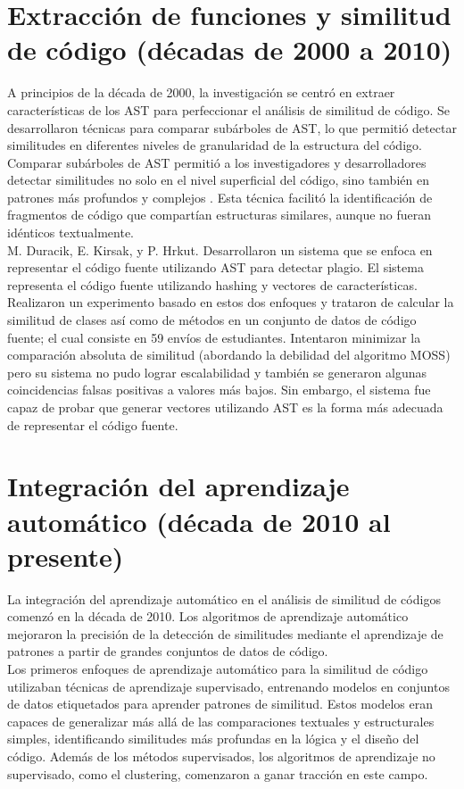 \section*{\textbf{Extracción de funciones y similitud de código (décadas de 2000 a 2010)}}
A principios de la década de 2000, la investigación se centró en extraer características de los AST para perfeccionar el análisis de similitud de código. Se desarrollaron técnicas para comparar subárboles de AST, lo que permitió detectar similitudes en diferentes niveles de granularidad de la estructura del código. \\

Comparar subárboles de AST permitió a los investigadores y desarrolladores detectar similitudes no solo en el nivel superficial del código, sino también en patrones más profundos y complejos \cite{kam2005analyzing}. Esta técnica facilitó la identificación de fragmentos de código que compartían estructuras similares, aunque no fueran idénticos textualmente. \\

M. Duracik, E. Kirsak, y P. Hrkut. \cite{duracik2018source} Desarrollaron un sistema que se enfoca en representar el código fuente utilizando AST para detectar plagio. El sistema representa el código fuente utilizando hashing y vectores de características. Realizaron un experimento basado en estos dos enfoques y trataron de calcular la similitud de clases así como de métodos en un conjunto de datos de código fuente; el cual consiste en 59 envíos de estudiantes. Intentaron minimizar la comparación absoluta de similitud (abordando la debilidad del algoritmo MOSS) pero su sistema no pudo lograr escalabilidad y también se generaron algunas coincidencias falsas positivas a valores más bajos. Sin embargo, el sistema fue capaz de probar que generar vectores utilizando AST es la forma más adecuada de representar el código fuente.

\section*{\textbf{Integración del aprendizaje automático (década de 2010 al presente)}}
La integración del aprendizaje automático en el análisis de similitud de códigos comenzó en la década de 2010. Los algoritmos de aprendizaje automático mejoraron la precisión de la detección de similitudes mediante el aprendizaje de patrones a partir de grandes conjuntos de datos de código. \\

Los primeros enfoques de aprendizaje automático para la similitud de código utilizaban técnicas de aprendizaje supervisado, entrenando modelos en conjuntos de datos etiquetados para aprender patrones de similitud. Estos modelos eran capaces de generalizar más allá de las comparaciones textuales y estructurales simples, identificando similitudes más profundas en la lógica y el diseño del código. Además de los métodos supervisados, los algoritmos de aprendizaje no supervisado, como el clustering, comenzaron a ganar tracción en este campo. \\

